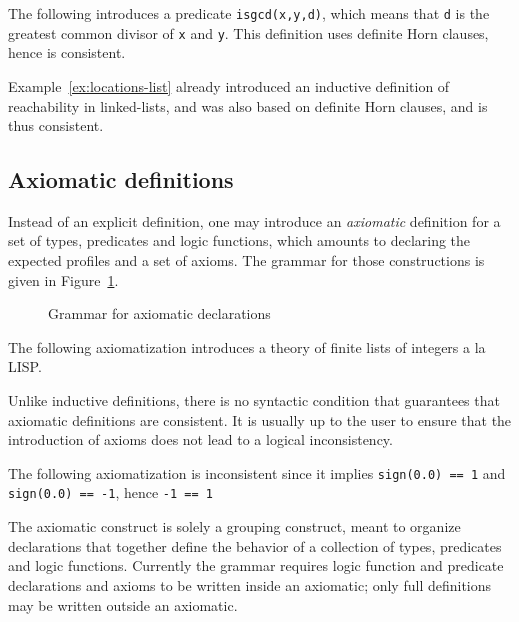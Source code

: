 \begin{example}
  The following introduces a predicate \lstinline|isgcd(x,y,d)|, which means
  that \lstinline|d| is the greatest common divisor of \lstinline|x|
  and \lstinline|y|.
  This definition uses definite Horn clauses, hence is consistent.
\end{example}

Example~\ref{ex:locations-list} already introduced an inductive definition of
reachability in linked-lists, and was also based on definite Horn
clauses, and is thus consistent.

\subsection{Axiomatic definitions}

Instead of an explicit definition, one may introduce an
\emph{axiomatic} definition for a set of types, predicates and logic
functions, which amounts to declaring the expected profiles and a set of
axioms. The grammar for those constructions is given in
Figure~\ref{fig:gram:logicdecl}.

\begin{figure}[t]
  \begin{cadre} 
    
    \end{cadre}
  \caption{Grammar for axiomatic declarations}
\label{fig:gram:logicdecl}
\end{figure}

\begin{example}
  The following axiomatization introduces a theory of finite lists of
  integers a la LISP.
\end{example}

Unlike inductive definitions, there is no syntactic condition that
 guarantees that axiomatic definitions are consistent. It is usually
up to the user to ensure that the introduction of axioms does not lead
to a logical inconsistency.

\begin{example}
  The following axiomatization
  is inconsistent since
  it implies \lstinline|sign(0.0) == 1| and \lstinline|sign(0.0) == -1|,
  hence \lstinline|-1 == 1|
\end{example}

The axiomatic construct is solely a grouping construct, meant to organize declarations that together define the behavior of a collection of types, predicates and logic functions. Currently the grammar 
requires logic function and predicate declarations and axioms to be written inside an axiomatic; only full definitions may be written outside an axiomatic.

